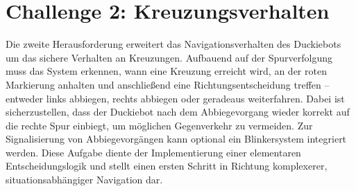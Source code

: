 \chapter{Challenge 2: Kreuzungsverhalten}
\label{ch:Challenge_2}
Die zweite Herausforderung erweitert das Navigationsverhalten des Duckiebots um das sichere Verhalten an Kreuzungen. 
Aufbauend auf der Spurverfolgung muss das System erkennen, wann eine Kreuzung erreicht wird, an der roten Markierung 
anhalten und anschließend eine Richtungsentscheidung treffen – entweder links abbiegen, rechts abbiegen oder geradeaus 
weiterfahren. Dabei ist sicherzustellen, dass der Duckiebot nach dem Abbiegevorgang wieder korrekt auf die rechte Spur 
einbiegt, um möglichen Gegenverkehr zu vermeiden. Zur Signalisierung von Abbiegevorgängen kann optional ein Blinkersystem 
integriert werden. Diese Aufgabe diente der Implementierung einer elementaren Entscheidungslogik und stellt einen ersten 
Schritt in Richtung komplexerer, situationsabhängiger Navigation dar. 